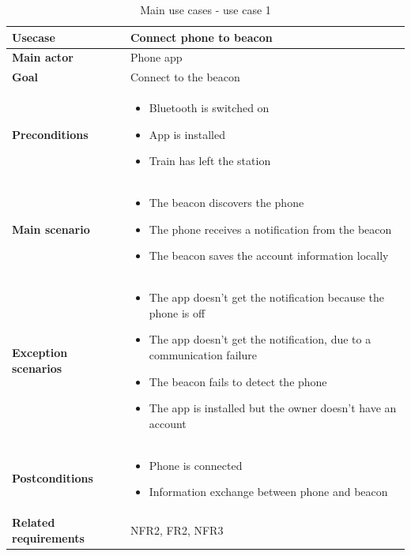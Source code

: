 \begin{table}[H]
	\centering
	\begin{tabularx}{\linewidth}{l|X}
		\textbf{Usecase}      & Connect phone to beacon \\ \hline
		\textbf{Main actor}  & Phone app \\ \hline
		\textbf{Goal}   & Connect to the beacon \\ \hline
		\textbf{Preconditions}     & \begin{itemize}
			\item Bluetooth is switched on
			\item App is installed
			\item Train has left the station
		\end{itemize} \\ \hline
		\textbf{Main scenario}    & \begin{itemize}
			\item The beacon discovers the phone
			\item The phone receives a notification from the beacon
			\item The beacon saves the account information locally
		\end{itemize} \\ \hline
		\textbf{Exception scenarios} & 
		\begin{itemize}
			\item The app doesn’t get the notification because
			the phone is off
			\item The app doesn’t get the notification, due to a
			communication failure 
			\item The beacon fails to detect the phone
			\item The app is installed but the owner doesn't have an account
		\end{itemize}
		\\ \hline
		\textbf{Postconditions} & 
		\begin{itemize}
			\item Phone is connected
			\item Information exchange between phone and beacon
		\end{itemize}
		
		\\ \hline
		\textbf{Related requirements} & NFR2, FR2, NFR3\\ \hline
	\end{tabularx}
	\caption{Main use cases - use case 1}
	\label{tbl:uc1}
\end{table}

